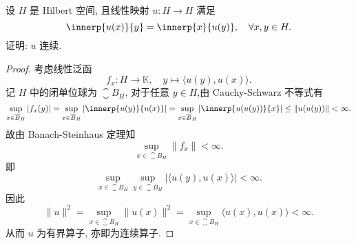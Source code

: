 \begin{exercise}
    设 $H$ 是 Hilbert 空间, 且线性映射 $u:H\to H$ 满足
    \[\innerp{u(x)}{y}=\innerp{x}{u(y)},\quad\forall x,y\in H.\]
    证明: $u$ 连续.
\end{exercise}

\begin{proof}
    考虑线性泛函
    \[f_x\colon H\to\mathbb{K},\quad y\mapsto\langle u(y),u(x)\rangle.\]
    记 $H$ 中的闭单位球为 $\closure{B}_H$, 对于任意 $y\in H$,由 Cauchy-Schwarz 不等式有
    \[\sup_{x\in\closure{B}_H}|f_x(y)|
      = \sup_{x\in\closure{B}_H}|\innerp{u(y)}{u(x)}|
      = \sup_{x\in \closure{B}_H}|\innerp{u(u(y))}{x}|\leq\|u(u(y))\|<\infty.\]
    故由 Banach-Steinhaus 定理知
    \[\sup_{x\in \closure{B}_H}\|f_x\|<\infty.\]
    即
    \[\sup_{x\in \closure{B}_H}\sup_{y\in \closure{B_H}}|\langle u(y),u(x)\rangle|<\infty.\]
    因此
    \[\|u\|^2=\sup_{x\in\closure{B}_H}\|u(x)\|^2
      = \sup_{x\in \closure{B}_H}\langle u(x),u(x)\rangle < \infty.\]
    从而 $u$ 为有界算子, 亦即为连续算子.
\end{proof}
